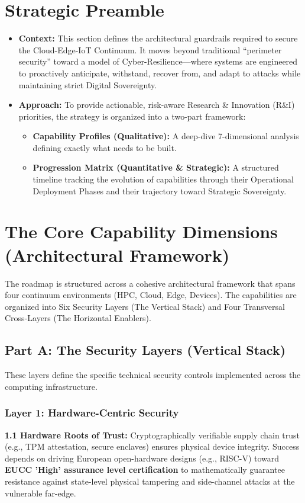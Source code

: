 \documentclass[12pt,a4paper]{article}
\begin{document}
\section{Strategic Preamble}
\begin{itemize}
    \item \textbf{Context:} This section defines the architectural guardrails required to secure the Cloud-Edge-IoT Continuum. It moves beyond traditional ``perimeter security'' toward a model of Cyber-Resilience---where systems are engineered to proactively anticipate, withstand, recover from, and adapt to attacks while maintaining strict Digital Sovereignty.
    \item \textbf{Approach:} To provide actionable, risk-aware Research \& Innovation (R\&I) priorities, the strategy is organized into a two-part framework:
    \begin{itemize}
        \item \textbf{Capability Profiles (Qualitative):} A deep-dive 7-dimensional analysis defining exactly what needs to be built.
        \item \textbf{Progression Matrix (Quantitative \& Strategic):} A structured timeline tracking the evolution of capabilities through their Operational Deployment Phases and their trajectory toward Strategic Sovereignty.
    \end{itemize}
\end{itemize}

\section{The Core Capability Dimensions (Architectural Framework)}
The roadmap is structured across a cohesive architectural framework that spans four continuum environments (HPC, Cloud, Edge, Devices). The capabilities are organized into Six Security Layers (The Vertical Stack) and Four Transversal Cross-Layers (The Horizontal Enablers).

\subsection*{Part A: The Security Layers (Vertical Stack)}
These layers define the specific technical security controls implemented across the computing infrastructure.

\subsubsection*{Layer 1: Hardware-Centric Security}
\textbf{1.1 Hardware Roots of Trust:} Cryptographically verifiable supply chain trust (e.g., TPM attestation, secure enclaves) ensures physical device integrity. Success depends on driving European open-hardware designs (e.g., RISC-V) toward \textbf{EUCC 'High' assurance level certification} \cite{eucc} to mathematically guarantee resistance against state-level physical tampering and side-channel attacks at the vulnerable far-edge.
\end{document}
